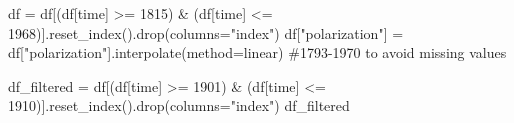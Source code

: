 \documentclass[
  letterpaper,
  DIV=11,
  numbers=noendperiod]{scrartcl}
\newenvironment{Shaded}{\begin{snugshade}}{\end{snugshade}}
\newcommand{\CommentTok}[1]{\textcolor[rgb]{0.37,0.37,0.37}{#1}}
\newcommand{\DecValTok}[1]{\textcolor[rgb]{0.68,0.00,0.00}{#1}}
\newcommand{\NormalTok}[1]{\textcolor[rgb]{0.00,0.23,0.31}{#1}}
\newcommand{\OperatorTok}[1]{\textcolor[rgb]{0.37,0.37,0.37}{#1}}
\newcommand{\StringTok}[1]{\textcolor[rgb]{0.13,0.47,0.30}{#1}}
\begin{document}
\begin{Shaded}
\begin{Highlighting}[]
\NormalTok{df }\OperatorTok{=}\NormalTok{ df[(df[}\StringTok{\textquotesingle{}time\textquotesingle{}}\NormalTok{] }\OperatorTok{\textgreater{}=} \DecValTok{1815}\NormalTok{) }\OperatorTok{\&}\NormalTok{ (df[}\StringTok{\textquotesingle{}time\textquotesingle{}}\NormalTok{] }\OperatorTok{\textless{}=} \DecValTok{1968}\NormalTok{)].reset\_index().drop(columns}\OperatorTok{=}\StringTok{"index"}\NormalTok{)}
\NormalTok{df[}\StringTok{"polarization"}\NormalTok{] }\OperatorTok{=}\NormalTok{ df[}\StringTok{"polarization"}\NormalTok{].interpolate(method}\OperatorTok{=}\StringTok{\textquotesingle{}linear\textquotesingle{}}\NormalTok{)}
\CommentTok{\#1793{-}1970 to avoid missing values}
\end{Highlighting}
\end{Shaded}

\begin{Shaded}
\begin{Highlighting}[]
\NormalTok{df\_filtered }\OperatorTok{=}\NormalTok{ df[(df[}\StringTok{\textquotesingle{}time\textquotesingle{}}\NormalTok{] }\OperatorTok{\textgreater{}=} \DecValTok{1901}\NormalTok{) }\OperatorTok{\&}\NormalTok{ (df[}\StringTok{\textquotesingle{}time\textquotesingle{}}\NormalTok{] }\OperatorTok{\textless{}=} \DecValTok{1910}\NormalTok{)].reset\_index().drop(columns}\OperatorTok{=}\StringTok{"index"}\NormalTok{)}
\NormalTok{df\_filtered}
\end{Highlighting}
\end{Shaded}
\end{document}

